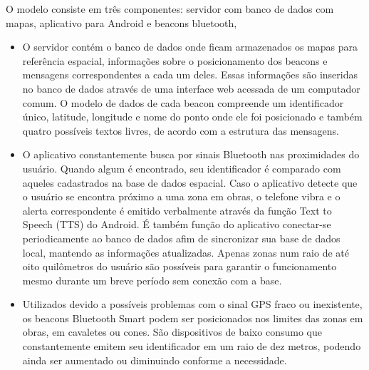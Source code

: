 \documentclass[english,brazilian]{UNISINOSmonografia}
\begin{document}
O modelo consiste em três componentes: servidor com banco de dados com mapas, aplicativo para Android e beacons bluetooth, 
\begin{itemize}
	\item O servidor contém o banco de dados onde ficam armazenados os mapas para referência espacial, informações sobre o posicionamento dos beacons e mensagens correspondentes a cada um deles. Essas informações são inseridas no banco de dados através de uma interface web acessada de um computador comum. O modelo de dados de cada beacon compreende um identificador único, latitude, longitude e nome do ponto onde ele foi posicionado e também quatro possíveis textos livres, de acordo com a estrutura das mensagens.

	\item O aplicativo constantemente busca por sinais Bluetooth nas proximidades do usuário. Quando algum é encontrado, seu identificador é comparado com aqueles cadastrados na base de dados espacial. Caso o aplicativo detecte que o usuário se encontra próximo a uma zona em obras, o telefone vibra e o alerta correspondente é emitido verbalmente através da função Text to Speech (TTS) do Android. É também função do aplicativo conectar-se periodicamente ao banco de dados afim de sincronizar sua base de dados local, mantendo as informações atualizadas. Apenas zonas num raio de até oito quilômetros do usuário são possíveis para garantir o funcionamento mesmo durante um breve período sem conexão com a base.
	
	\item Utilizados devido a possíveis problemas com o sinal GPS fraco ou inexistente, os beacons Bluetooth Smart podem ser posicionados nos limites das zonas em obras, em cavaletes ou cones. São dispositivos de baixo consumo que constantemente emitem seu identificador em um raio de dez metros, podendo ainda ser aumentado ou diminuindo conforme a necessidade.
\end{itemize}
\end{document}
